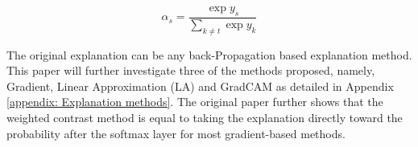 \begin{equation}
\label{eq: weighted-alpha}
    \alpha_s = \frac{\exp{y_s}}{\sum_{k \neq t}\exp{y_k}}
\end{equation}

The original explanation can be any back-Propagation based explanation method. This paper will further investigate three of the methods proposed, namely, Gradient, Linear Approximation (LA) and GradCAM as detailed in Appendix \ref{appendix: Explanation methods}. The original paper further shows that the weighted contrast method is equal to taking the explanation directly toward the probability after the softmax layer for most gradient-based methods.

\begin{comment}

In the original paper, four different explanation methods are compared, original, mean-, max- and weighted contrast, where weighted contrast is considered the paper's novel contribution. Weighted contrast is formulated as

\begin{equation}
    \phi_i^t(\pmb{x})_{\textnormal{weighted}} = \phi_i^t(\pmb{x}) - \sum_{s \neq t} \alpha_s \phi_i^s(\pmb{x})
\end{equation}

where $\phi_i$ is the original explanation for pixel $i$ and the weight $\alpha$ is the softmax activation of the logit vector without the target class $t$

\begin{equation}
    \alpha_s = \frac{\exp{y_s}}{\sum_{k \neq t}\exp{y_k}}
\end{equation}

The paper further shows that the weighted contrast method is equal to taking the explanation directly toward the probability after the softmax layer. 
\end{comment}

